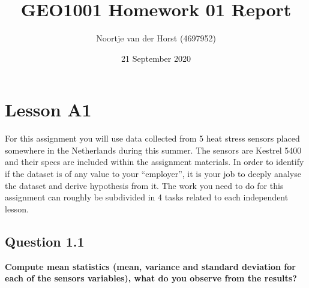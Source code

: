 \documentclass{report}
\title{GEO1001 Homework 01 Report}
\author{Noortje van der Horst (4697952)}
\date{21 September 2020}
\begin{document}
	
	\maketitle
	
	\section{Lesson A1}
	For this assignment you will use data collected from 5 heat stress sensors placed somewhere in the Netherlands during this summer. The sensors are Kestrel 5400 and their specs are included within the assignment materials. In order to identify if the dataset is of any value to your “employer”, it is your job to deeply analyse the dataset and derive hypothesis from it. The work you need to do for this assignment can roughly be subdivided in 4 tasks related to each independent lesson.
	
	
	\subsection{Question 1.1}
	\textbf{Compute mean statistics (mean, variance and standard deviation for each of the sensors variables), what do you observe from the results?}
	
\end{document}
